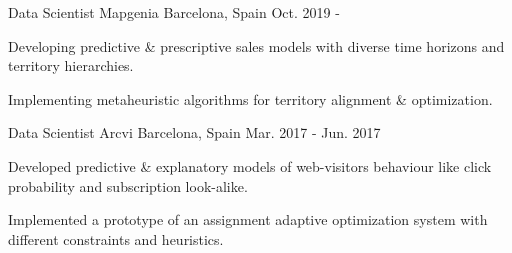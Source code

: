 
\begin{cventries}

\cventry
  {Data Scientist}
  {Mapgenia}
  {Barcelona, Spain}
  {Oct. 2019 - }
  {
    \begin{cvitems}
      \item {Developing predictive \& prescriptive sales models with diverse time horizons and territory hierarchies.}
      \item {Implementing metaheuristic algorithms for territory alignment \& optimization.}
    \end{cvitems}
  }

\cventry
  {Data Scientist}
  {Arcvi}
  {Barcelona, Spain}
  {Mar. 2017 - Jun. 2017}
  {
    \begin{cvitems}
      \item {Developed predictive \& explanatory models of web-visitors behaviour like click probability and subscription look-alike.}
      \item {Implemented a prototype of an assignment adaptive optimization system with different constraints and heuristics.}
    \end{cvitems}
  }

\end{cventries}
